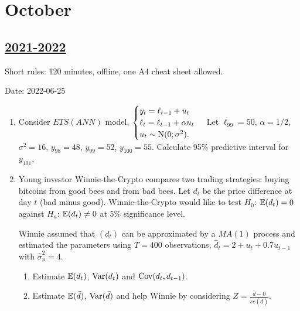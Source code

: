 
\newpage
\thispagestyle{empty}
\section{October}
 


\subsection[2021-2022]{\hyperref[sec:sol_kr_04_2021_2022]{2021-2022}}
\label{sec:kr_04_2021_2022} %

Short rules: 120 minutes, offline, one A4 cheat sheet allowed.

Date: 2022-06-25

\begin{enumerate}

\item Consider $ETS(ANN)$ model,
	$
	\begin{cases}
	y_t = \ell_{t-1} + u_t \\
	\ell_t = \ell_{t-1} + \alpha u_t \\
	u_t \sim \mathrm{N}(0;\sigma^2). \\
	\end{cases}
	$
Let $\ell_{99} = 50$, $\alpha = 1/2$, $\sigma^2 = 16$, $y_{98} = 48$, $y_{99} = 52$, $y_{100} = 55$. Calculate 95\% predictive interval for $y_{101}$.

\item Young investor Winnie-the-Crypto compares two trading strategies: buying bitcoins from good bees and from bad bees. 
Let $d_t$ be the price difference at day $t$ (bad minus good). 
Winnie-the-Crypto would like to test $H_0$: $\operatorname{\mathbb{E}}(d_t) = 0$ against $H_a$: $\operatorname{\mathbb{E}}(d_t) \neq 0$ at $5\%$ significance level.

Winnie assumed that $(d_t)$ can be approximated by a $MA(1)$ process and estimated the parameters using $T=400$ observations, $\hat d_t = 2 + u_t + 0.7 u_{t-1}$ 
with $\hat\sigma^2_u = 4$.

\begin{enumerate}
	\item Estimate $\operatorname{\mathbb{E}}(d_t)$, $\operatorname{Var}(d_t)$ and $\operatorname{Cov}(d_t, d_{t-1})$.
	\item Estimate $\operatorname{\mathbb{E}}(\bar d)$, $\operatorname{Var}(\bar d)$ and help Winnie by considering $Z = \frac{\bar d - 0}{se(\bar d)}$.
\end{enumerate}




\end{enumerate}
